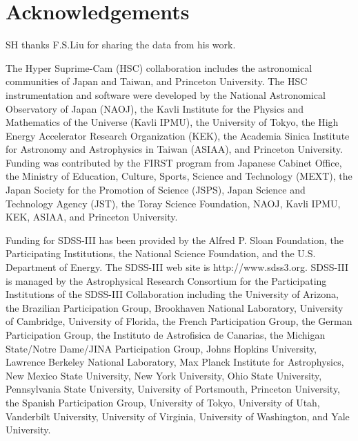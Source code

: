 \documentclass[a4paper,fleqn,usenatbib]{mnras}
\begin{document}
  
\section*{Acknowledgements}

  SH thanks F.S.Liu for sharing the data from his work.

  The Hyper Suprime-Cam (HSC) collaboration includes the astronomical communities of 
  Japan and Taiwan, and Princeton University.  The HSC instrumentation and software were
  developed by the National Astronomical Observatory of Japan (NAOJ), the Kavli Institute
  for the Physics and Mathematics of the Universe (Kavli IPMU), the University of Tokyo,
  the High Energy Accelerator Research Organization (KEK), the Academia Sinica Institute
  for Astronomy and Astrophysics in Taiwan (ASIAA), and Princeton University.  
  Funding was contributed by the FIRST program from Japanese Cabinet Office, the Ministry 
  of Education, Culture, Sports, Science and Technology (MEXT), the Japan Society for 
  the Promotion of Science (JSPS), Japan Science and Technology Agency (JST), the
  Toray Science Foundation, NAOJ, Kavli IPMU, KEK, ASIAA, and Princeton University.
   
  Funding for SDSS-III has been provided by the Alfred P. Sloan Foundation, the
  Participating Institutions, the National Science Foundation, and the U.S.  Department of
  Energy. The SDSS-III web site is http://www.sdss3.org.  SDSS-III is managed by the
  Astrophysical Research Consortium for the Participating Institutions of the SDSS-III
  Collaboration including the University of Arizona, the Brazilian Participation Group,
  Brookhaven National Laboratory, University of Cambridge, University of Florida, the
  French Participation Group, the German Participation Group, the Instituto de Astrofisica
  de Canarias, the Michigan State/Notre Dame/JINA Participation Group, Johns Hopkins
  University, Lawrence Berkeley National Laboratory, Max Planck Institute for
  Astrophysics, New Mexico State University, New York University, Ohio State University,
  Pennsylvania State University, University of Portsmouth, Princeton University, the
  Spanish Participation Group, University of Tokyo, University of Utah, Vanderbilt
  University, University of Virginia, University of Washington, and Yale University.
  
\end{document}
